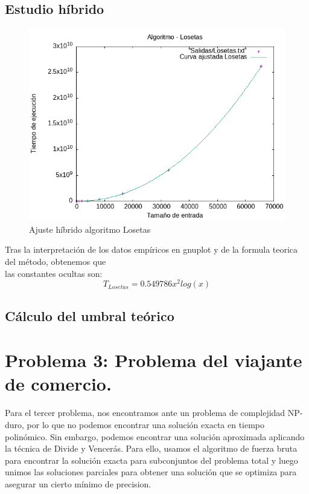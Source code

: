 \documentclass[11pt,openany]{book}
\begin{document}
\subsection{Estudio híbrido}
\begin{center}
      \begin{figure}[H]
            \centering
            \includegraphics[width=0.7\linewidth]{assets/Img/Losetas_hib.png}
            \caption{Ajuste híbrido algoritmo Losetas}
            \label{fig:Losetas}
      \end{figure}
\end{center}
Tras la interpretación de los datos empíricos en gnuplot y de la formula teorica del método, obtenemos que \\
las constantes ocultas son:
\begin{equation*}
      T_{Losetas}=0.549786x^2log(x)
\end{equation*}
\subsection{Cálculo del umbral teórico}


\section{Problema 3: Problema del viajante de comercio.}
Para el tercer problema, nos encontramos ante un problema de complejidad
NP-duro, por lo que no podemos encontrar una solución exacta en tiempo polinómico.
Sin embargo, podemos encontrar una solución aproximada aplicando la técnica de Divide y Vencerás.
Para ello, usamos el algoritmo de fuerza bruta para encontrar la solución exacta para subconjuntos
del problema total y luego unimos las soluciones parciales para obtener una solución que se optimiza
para asegurar un cierto mínimo de precision.
\end{document}
